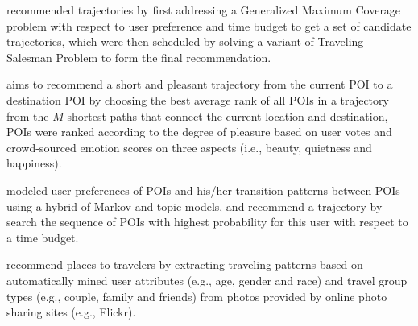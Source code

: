 \cite{tripbuilder15} recommended trajectories by first addressing a Generalized Maximum Coverage problem with respect to user preference and 
time budget to get a set of candidate trajectories, which were then scheduled by solving a variant of Traveling Salesman Problem to form the 
final recommendation.

\cite{ht14} aims to recommend a short and pleasant trajectory from the current POI to a destination POI by choosing the best average rank 
of all POIs in a trajectory from the $M$ shortest paths that connect the current location and destination,
POIs were ranked according to the degree of pleasure based on user votes and  crowd-sourced emotion scores on three aspects 
(i.e., beauty, quietness and happiness).

\cite{geophoto13} modeled user preferences of POIs and his/her transition patterns between POIs using a hybrid of 
Markov and topic models, and recommend a trajectory by search the sequence of POIs with highest probability for this user 
with respect to a time budget.

\cite{travel13} recommend places to travelers by extracting traveling patterns based on automatically mined user attributes 
(e.g., age, gender and race) and travel group types (e.g., couple, family and friends) from photos provided by online photo 
sharing sites (e.g., Flickr).
